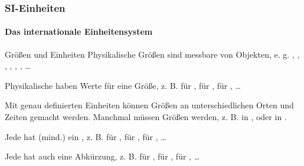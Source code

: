 \begin{frame}
  \frametitle{SI-Einheiten}
  \framesubtitle{Das internationale Einheitensystem}
  \begin{block}{Gr\"o\ss{}en und Einheiten}
    \pause 
    Physikalische Gr\"o\ss{}en sind messbare  von 
    Objekten, e. g. , ,
    , , , , \dots
    \pause
    
    Physikalische  haben  
    Werte f\"ur eine Gr\"o\ss{}e, z. B.  f\"ur
    ,  f\"ur ,
     f\"ur , \dots
    
    \pause
    Mit genau definierten Einheiten k\"onnen Gr\"o\ss{}en an unterschiedlichen
    Orten und Zeiten  gemacht werden. Manchmal 
    m\"ussen Gr\"o\ss{}en  werden, z. B.
     in , oder  in
    .

    \pause 
    Jede  hat (mind.) ein , z. B.
     f\"ur ,  f\"ur
    ,  f\"ur , \dots

    \pause 
    Jede  hat auch eine Abk\"urzung, z. B.
     f\"ur ,  f\"ur
    ,  f\"ur , \dots
  \end{block} 
\end{frame}

